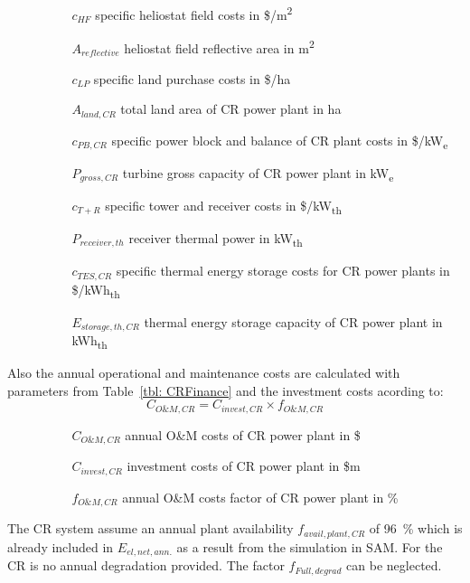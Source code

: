 \begin{itemize}
\item[ ] 
\begin{itemize}
\item[ ] 
\begin{itemize}
\item[$c_{HF}$]specific heliostat field costs in \$/m\textsuperscript{2}
\item[$A_{reflective}$]heliostat field reflective area in m\textsuperscript{2}
\item[$c_{LP}$]specific land purchase costs in \$/ha
\item[$A_{land,CR}$]total land area of CR power plant in ha
\item[$c_{PB,CR}$]specific power block and balance of CR plant costs in \$/kW\textsubscript{e}
\item[$P_{gross,CR}$]turbine gross capacity of CR power plant in kW\textsubscript{e}
\item[$c_{T+R}$]specific tower and receiver costs in \$/kW\textsubscript{th}
\item[$P_{receiver,th}$]receiver thermal power in kW\textsubscript{th}
\item[$c_{TES,CR}$]specific thermal energy storage costs for CR power plants in \$/kWh\textsubscript{th}
\item[$E_{storage,th,CR}$]thermal energy storage capacity of CR power plant in kWh\textsubscript{th}
\end{itemize}
\end{itemize}
\end{itemize}
Also the annual operational and maintenance costs are calculated with parameters from Table~\ref{tbl: CRFinance} and the investment costs acording to:
\begin{equation}
C_{O\&M,CR} = C_{invest,CR} \times f_{O\&M,CR}
\end{equation} 
\begin{itemize}
\item[ ] 
\begin{itemize}
\item[ ] 
\begin{itemize}
\item[$C_{O\&M,CR}$]annual O\&M costs of CR power plant in \$
\item[$C_{invest,CR}$]investment costs of CR power plant in \$m
\item[$f_{O\&M,CR}$]annual O\&M costs factor of CR power plant in \%
\end{itemize}
\end{itemize}
\end{itemize}
The CR system assume an annual plant availability $f_{avail,plant,CR}$ of 96~\% which is already included in $E_{el,net,ann.}$ as a result from the simulation in SAM. For the CR is no annual degradation provided. The factor $f_{Full,degrad}$ can be neglected.
